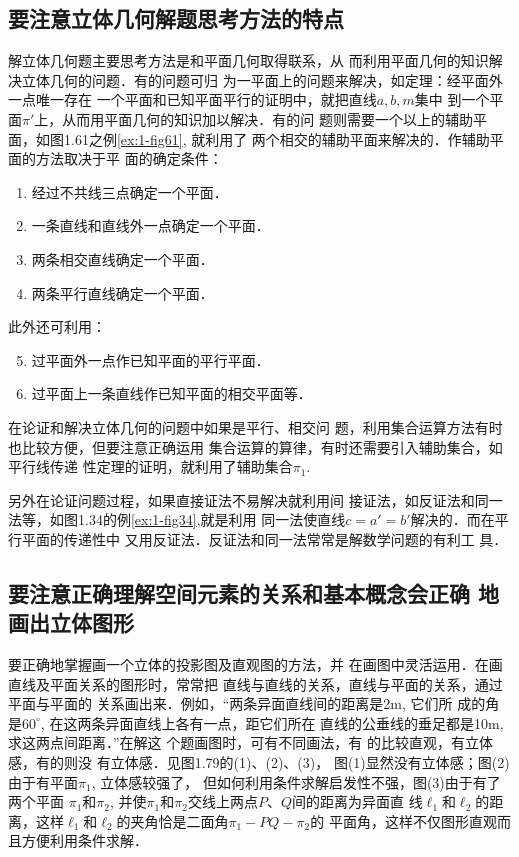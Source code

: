 \subsection{要注意立体几何解题思考方法的特点}
解立体几何题主要思考方法是和平面几何取得联系，从
而利用平面几何的知识解决立体几何的问题．有的问题可归
为一平面上的问题来解决，如定理：经平面外一点唯一存在
一个平面和已知平面平行的证明中，就把直线$a,b,m$集中
到一个平面$\pi'$上，从而用平面几何的知识加以解决．有的问
题则需要一个以上的辅助平面，如图1.61之例\ref{ex:1-fig61}, 就利用了
两个相交的辅助平面来解决的．作辅助平面的方法取决于平
面的确定条件：
\begin{enumerate}
\item 经过不共线三点确定一个平面．
\item 一条直线和直线外一点确定一个平面．
\item 两条相交直线确定一个平面．
\item 两条平行直线确定一个平面．
\end{enumerate}

此外还可利用：
\begin{enumerate}\setcounter{enumi}{4}
\item 过平面外一点作已知平面的平行平面．
\item 过平面上一条直线作已知平面的相交平面等．
\end{enumerate}

在论证和解决立体几何的问题中如果是平行、相交问
题，利用集合运算方法有时也比较方便，但要注意正确运用
集合运算的算律，有时还需要引入辅助集合，如平行线传递
性定理的证明，就利用了辅助集合$\pi_1$. 

另外在论证问题过程，如果直接证法不易解决就利用间
接证法，如反证法和同一法等，如图1.34的例\ref{ex:1-fig34},就是利用
同一法使直线$c=a'=b'$解决的．而在平行平面的传递性中
又用反证法．反证法和同一法常常是解数学问题的有利工
具．

\subsection{要注意正确理解空间元素的关系和基本概念会正确
地画出立体图形}
要正确地掌握画一个立体的投影图及直观图的方法，并
在画图中灵活运用．在画直线及平面关系的图形时，常常把
直线与直线的关系，直线与平面的关系，通过平面与平面的
关系画出来．例如，“两条异面直线间的距离是2m, 它们所
成的角是$60^{\circ}$, 在这两条异面直线上各有一点，距它们所在
直线的公垂线的垂足都是10m, 求这两点间距离．”在解这
个题画图时，可有不同画法，有
的比较直观，有立体感，有的则没
有立体感．见图1.79的(1)、(2)、(3)，
图(1)显然没有立体感；图(2)
由于有平面$\pi_1$, 立体感较强了，
但如何利用条件求解启发性不强，图(3)由于有了两个平面
$\pi_1$和$\pi_2$, 并使$\pi_1$和$\pi_2$交线上两点$P$、$Q$间的距离为异面直
线$\ell_1$和$\ell_2$的距离，这样$\ell_1$和$\ell_2$的夹角恰是二面角$\pi_1-PQ-\pi_2$的
平面角，这样不仅图形直观而且方便利用条件求解．


